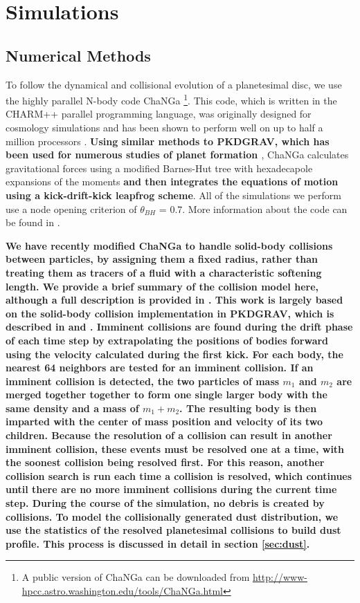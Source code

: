 \documentclass[fleqn,usenatbib]{mnras}
\begin{document}
\section{Simulations} \label{sec:sims}

\subsection{Numerical Methods}\label{sec:methods}

To follow the dynamical and collisional evolution of a planetesimal disc, we use the highly parallel N-body code {\sc ChaNGa} 
\footnote{A public version of {\sc ChaNGa} can be downloaded from \url{http://www-hpcc.astro.washington.edu/tools/ChaNGa.html}}. 
This code, which is written in the {\sc CHARM++} parallel programming language, was originally designed for cosmology simulations 
and has been shown to perform well on up to half a million processors \citep{2015AphCom..2..1}. \textbf{Using similar methods to {\sc PKDGRAV}, which has been used for numerous studies of planet formation \citep{2000Icar..143...45R, 2005ApJ...625..427L, 2013ApJ...777L..31D, 2015ApJ...806...23L}}, {\sc ChaNGa} calculates 
gravitational forces using a modified Barnes-Hut \citep{1986Natur.324..446B} tree with hexadecapole expansions of the moments \textbf{and then integrates the equations of motion using a kick-drift-kick leapfrog scheme}. 
All of the simulations we perform use a node opening criterion of $\theta_{BH}$ = 0.7. More information about the code can be found 
in \citet{2008IEEEpds...ChaNGa}.

\textbf{We have recently modified {\sc ChaNGa} to handle solid-body collisions between particles, by assigning them a fixed radius, rather than treating them as tracers of a fluid with a characteristic softening length. We provide a brief summary of the collision model here, although a full description is provided in \citet{2019MNRAS.489.2159W}. This work is largely based on the solid-body collision implementation in {\sc PKDGRAV}, which is described in \citet{1994MNRAS.269..493R} and \citet{2000Icar..143...45R}. Imminent collisions are found during the drift phase of each time step by extrapolating the positions of bodies forward using the velocity calculated during the first kick. For each body, the nearest 64 neighbors are tested for an imminent collision. If an imminent collision is detected, the two particles of mass $m_{1}$ and $m_{2}$ are merged together together to form one single larger body with the same density and a mass of $m_{1} + m_{2}$. The resulting body is then imparted with the center of mass position and velocity of its two children. Because the resolution of a collision can result in another imminent collision, these events must be resolved one at a time, with the soonest collision being resolved first. For this reason, another collision search is run each time a collision is resolved, which continues until there are no more imminent collisions during the current time step. During the course of the simulation, no debris is created by collisions. To model the collisionally generated dust distribution, we use the statistics of the resolved planetesimal collisions to build dust profile. This process is discussed in detail in section \ref{sec:dust}.}
\end{document}
